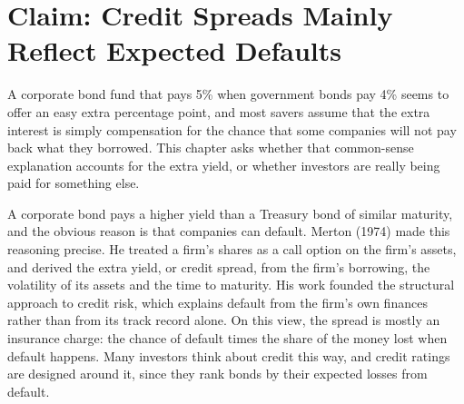 \makeatletter
{}
\makeatother

\makeatletter
\makeatother

\chapter{Claim: Credit Spreads Mainly Reflect Expected Defaults}
\label{ch:15}

A corporate bond fund that pays 5\% when government bonds pay 4\% seems to offer an easy extra percentage point, and most savers assume that the extra interest is simply compensation for the chance that some companies will not pay back what they borrowed. This chapter asks whether that common-sense explanation accounts for the extra yield, or whether investors are really being paid for something else.

A corporate bond pays a higher yield than a Treasury bond of similar maturity, and the obvious reason is that companies can default. Merton (1974) made this reasoning precise. He treated a firm's shares as a call option on the firm's assets, and derived the extra yield, or credit spread, from the firm's borrowing, the volatility of its assets and the time to maturity. His work founded the structural approach to credit risk, which explains default from the firm's own finances rather than from its track record alone. On this view, the spread is mostly an insurance charge: the chance of default times the share of the money lost when default happens. Many investors think about credit this way, and credit ratings are designed around it, since they rank bonds by their expected losses from default.


